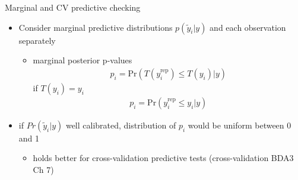 \documentclass[t]{beamer}
\DeclareMathOperator{\rep}{\mathrm{rep}}
\begin{document}



\begin{frame}{Marginal and CV predictive checking}

  \begin{itemize}
  \item Consider marginal predictive distributions $p(\tilde{y}_i|y)$
    and each observation separately
    \begin{itemize}
    \item marginal posterior p-values
      \begin{align*}
        p_i = \mbox{Pr}(T(y_i^{\rep}) \leq T(y_i) | y)
      \end{align*}
      if $T(y_i)=y_i$
      \begin{align*}
        p_i = \mbox{Pr}(y_i^{\rep} \leq y_i | y)
      \end{align*}
    \end{itemize}
  \item<2-> if $Pr(\tilde{y}_i|y)$ well calibrated, distribution of $p_i$
    would be uniform between 0 and 1
    \begin{itemize}
    \item holds better for cross-validation predictive tests
      (cross-validation BDA3 Ch 7) 
    \end{itemize}
  \end{itemize}

\end{frame}
\end{document}
